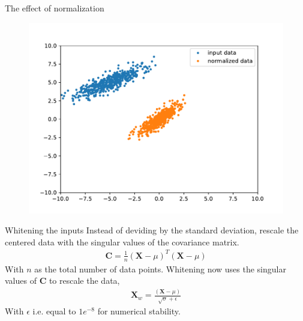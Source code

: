 \documentclass[notes]{beamer}
\begin{document}
    \begin{frame}{The effect of normalization}
      \begin{figure}
      \includegraphics[width=\linewidth]{./figures/normalized.pdf}
      \end{figure}
    \end{frame}

    \begin{frame}{Whitening the inputs}
      Instead of deviding by the standard deviation, rescale the centered data with the singular values of the covariance matrix.
      \begin{align}
        \mathbf{C} = \frac{1}{n} (\mathbf{X} - \mu)^T(\mathbf{X} - \mu)
      \end{align}
      With $n$ as the total number of data points.
      Whitening now uses the singular values of $\mathbf{C}$ to rescale the data,
      \begin{align}
        \mathbf{X}_w = \frac{(\mathbf{X} - \mu)}{\sqrt{\sigma} + \epsilon}
      \end{align}
      With $\epsilon$ i.e. equal to $1e^{-8}$ for numerical stability.
    \end{frame}
\end{document}

